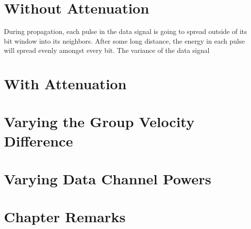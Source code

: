\section{Without Attenuation}

During propagation, each pulse in the data signal is going to spread outside of its bit window into its neighbors. After some long distance, the energy in each pulse will spread evenly amongst every bit. The variance of the data signal 

\section{With Attenuation}

\section{Varying the Group Velocity Difference}

\section{Varying Data Channel Powers}



\section{Chapter Remarks}